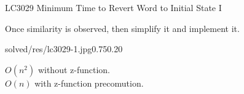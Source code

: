 \begin{problem}{LC3029 Minimum Time to Revert Word to Initial State I}
    
\end{problem}

\begin{fullwidth}

    \begin{solution}[$O(n^2), O(n)$]
        

        Once similarity is observed, then simplify it and implement it.

        \begin{lfigure}{solved/res/lc3029-1.jpg}{0.75}{0.20}
            
            $O(n^2)$ without z-function.\\
            $O(n)$ with z-function precomution.
            

        \end{lfigure}
        
    \end{solution}


\end{fullwidth}